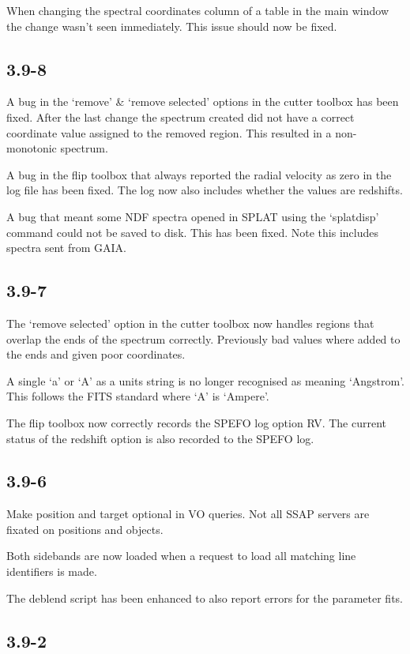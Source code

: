 \documentclass[twoside,11pt]{article}
\renewcommand{\_}{\texttt{\symbol{95}}}
\begin{document}
When changing the spectral coordinates column of a table in the main window
the change wasn't seen immediately. This issue should now be fixed.


\subsection{3.9-8}

A bug in the `remove' \& `remove selected' options in the cutter toolbox has
been fixed. After the last change the spectrum created did not have a correct
coordinate value assigned to the removed region. This resulted in a
non-monotonic spectrum.

A bug in the flip toolbox that always reported the radial velocity as zero in
the log file has been fixed. The log now also includes whether the values are
redshifts.

A bug that meant some NDF spectra opened in SPLAT using the `splatdisp'
command could not be saved to disk. This has been fixed. Note this includes
spectra sent from GAIA.

\subsection{3.9-7}

The `remove selected' option in the cutter toolbox now handles regions that
overlap the ends of the spectrum correctly. Previously bad values where added
to the ends and given poor coordinates.

A single `a' or `A' as a units string is no longer recognised as meaning
`Angstrom'. This follows the FITS standard where `A' is `Ampere'.

The flip toolbox now correctly records the SPEFO log option RV.  The current
status of the redshift option is also recorded to the SPEFO log.

\subsection{3.9-6}

Make position and target optional in VO queries. Not all SSAP servers are
fixated on positions and objects.

Both sidebands are now loaded when a request to load all matching line
identifiers is made.

The deblend script has been enhanced to also report errors for the parameter
fits.

\subsection{3.9-2}
\end{document}
